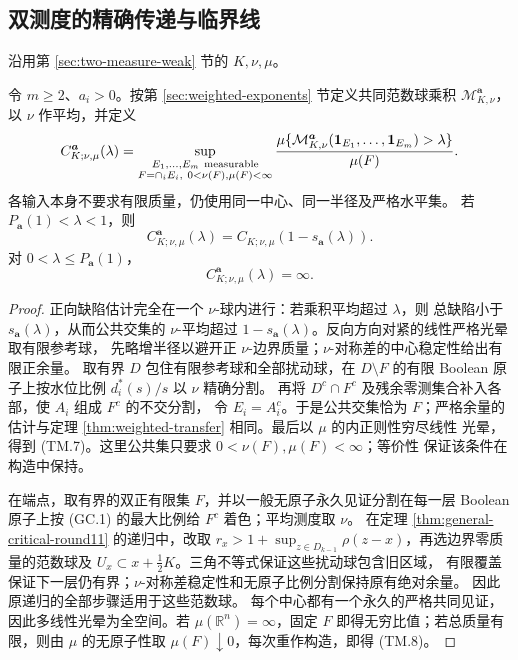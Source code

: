 \subsection{双测度的精确传递与临界线}\label{subsec:two-measure-critical}
沿用第 \ref{sec:two-measure-weak} 节的 $K,\nu,\mu$。
\begin{theorem}[等价双测度的共同中心传递与临界线]\label{thm:two-measure-transfer}
令 $m\ge2$、$a_i>0$。按第 \ref{sec:weighted-exponents} 节定义共同范数球乘积
\(\mathcal M_{K,\nu}^{\boldsymbol a}\)，以 $\nu$ 作平均，并定义
\[C^{\boldsymbol a}_{K;\nu,\mu}(\lambda)=
\sup_{\substack{E_1,\ldots,E_m\ \mathrm{measurable}\\
F=\cap_iE_i,\ 0<\nu(F),\mu(F)<\infty}}
\frac{\mu\{\mathcal M_{K,\nu}^{\boldsymbol a}(\mathbf 1_{E_1},\ldots,\mathbf 1_{E_m})>\lambda\}}{\mu(F)}.\]
各输入本身不要求有限质量，仍使用同一中心、同一半径及严格水平集。
若 $P_{\boldsymbol a}(1)<\lambda<1$，则
\[
 C^{\boldsymbol a}_{K;\nu,\mu}(\lambda)
 =C_{K;\nu,\mu}(1-s_{\boldsymbol a}(\lambda)).\tag{TM.7}
\]
对 $0<\lambda\le P_{\boldsymbol a}(1)$，
\[
 C^{\boldsymbol a}_{K;\nu,\mu}(\lambda)=\infty.\tag{TM.8}
\]
\end{theorem}
\begin{proof}
正向缺陷估计完全在一个 $\nu$-球内进行：若乘积平均超过 $\lambda$，则
总缺陷小于 $s_{\boldsymbol a}(\lambda)$，从而公共交集的 $\nu$-平均超过
$1-s_{\boldsymbol a}(\lambda)$。反向方向对紧的线性严格光晕取有限参考球，
先略增半径以避开正 $\nu$-边界质量；$\nu$-对称差的中心稳定性给出有限正余量。
取有界 $D$ 包住有限参考球和全部扰动球，在 $D\setminus F$ 的有限
Boolean 原子上按水位比例 $d_i^*(s)/s$ 以 $\nu$ 精确分割。
再将 $D^c\cap F^c$ 及残余零测集合补入各部，使 $A_i$ 组成 $F^c$ 的不交分割，
令 $E_i=A_i^c$。于是公共交集恰为 $F$；严格余量的估计与定理
\ref{thm:weighted-transfer} 相同。最后以 $\mu$ 的内正则性穷尽线性
光晕，得到 (TM.7)。这里公共集只要求 $0<\nu(F),\mu(F)<\infty$；等价性
保证该条件在构造中保持。

在端点，取有界的双正有限集 $F$，并以一般无原子永久见证分割在每一层
Boolean 原子上按 (GC.1) 的最大比例给 $F^c$ 着色；平均测度取 $\nu$。
在定理 \ref{thm:general-critical-round11} 的递归中，改取
$r_x>1+\sup_{z\in D_{k-1}}\rho(z-x)$，再选边界零质量的范数球及
$U_x\subset x+\frac12K$。三角不等式保证这些扰动球包含旧区域，
有限覆盖保证下一层仍有界；$\nu$-对称差稳定性和无原子比例分割保持原有绝对余量。
因此原递归的全部步骤适用于这些范数球。
每个中心都有一个永久的严格共同见证，因此多线性光晕为全空间。若
$\mu(\mathbb R^n)=\infty$，固定 $F$ 即得无穷比值；若总质量有限，则由
$\mu$ 的无原子性取 $\mu(F)\downarrow0$，每次重作构造，即得 (TM.8)。
\end{proof}

